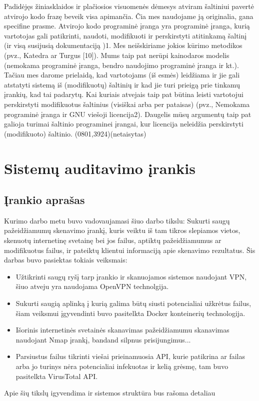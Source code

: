 \documentclass[a4paper,12pt,fleqn]{article}
\begin{document}
Padidėjęs žiniasklaidos ir plačiosios visuomenės dėmesys atviram šaltiniui pavertė atvirojo kodo frazę beveik visa apimančia. Čia mes naudojame ją originalia, gana specifine prasme. Atvirojo kodo programinė įranga yra programinė įranga, kurią vartotojas gali patikrinti, naudoti, modifikuoti ir perskirstyti atitinkamą šaltinį (ir visą susijusią dokumentaciją )1. Mes neišskiriame jokios kūrimo metodikos (pvz., Katedra ar Turgus [10]). Mums taip pat nerūpi kainodaros modelis (nemokama programinė įranga, bendro naudojimo programinė įranga ir kt.). Tačiau mes darome prielaidą, kad vartotojams (iš esmės) leidžiama ir jie gali atstatyti sistemą iš (modifikuotų) šaltinių ir kad jie turi prieigą prie tinkamų įrankių, kad tai padarytų. Kai kuriais atvejais taip pat būtina leisti vartotojui perskirstyti modifikuotus šaltinius (visiškai arba per pataisas) (pvz., Nemokama programinė įranga ir GNU viešoji licencija2). Daugelis mūsų argumentų taip pat galioja turimai šaltinio programinei įrangai, kur licencija neleidžia perskirstyti (modifikuoto) šaltinio. (0801,3924)(netaisytas)


\newpage
\section{Sistemų auditavimo įrankis}
\label{sec:motivation}

\subsection{Įrankio aprašas}
\label{sec:example}

Kurimo darbo metu buvo vadovaujamasi šiuo darbo tikslu: Sukurti saugų pažeidžiamumų skenavimo įrankį, kuris veiktu iš tam tikros slepiamos vietos, skenuotų internetinę
svetainę bei jos failus, aptiktų pažeidžiamumus ar modifikuotus failus, ir pateiktų klientui informaciją apie skenavimo rezultatus. Šis darbas buvo pasiektas tokiais veiksmais:
\begin{itemize}
	\item Užtikrinti saugų ryšį tarp įrankio ir skanuojamos sistemos naudojant VPN, šiuo atveju yra naudojama OpenVPN technolgija.
	\item Sukurti saugią aplinką į kurią galima būtų siusti potencialiai užkrėtus failus, šiam veiksmui įgyvendinti buvo pasitelkta Docker konteinerių technologija.
	\item Išorinis internetinės svetainės skanavimas pažeidžiamumu skanavimas naudojant Nmap įrankį, bandand silpnus prisijungimus...
	\item Parsiustus failus tikrinti viešai prieinamuosia API, kurie patikrina ar failas arba jo turinys nėra potencialiai infekuotas ir kelią grėsmę, tam buvo pasitelkta VirusTotal API.
\end{itemize}
Apie šių tikslų igyvendima ir sistemos struktūra bus rašoma detaliau
\end{document}
